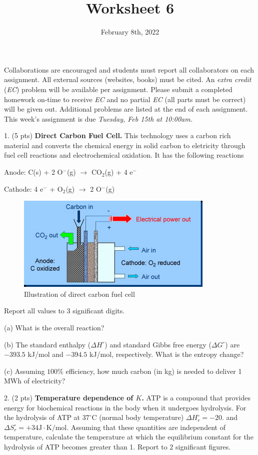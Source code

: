 \documentclass[11pt]{article}
\title{\textbf{Worksheet 6}}
\date{\vspace{-2em}February 8th, 2022}
\begin{document}
\maketitle

Collaborations are encouraged and students must report all collaborators
on each assignment. All external sources (websites, books) must be
cited. An \textit{extra credit} (\textit{EC}) problem will be available per
assignment. Please submit a completed homework on-time to receive \textit{EC}
and no partial \textit{EC} (all parts must be correct) will be given out.
Additional problems are listed at the end of each assignment. This week's
assignment is due \textit{Tuesday, Feb 15th at 10:00am.}

1. (5 pts) \textbf{Direct Carbon Fuel Cell.} This technology uses a carbon rich
material and converts the chemical energy in solid carbon to eletricity through
fuel cell reactions and electrochemical oxidation. It has the following reactions

  Anode: C(s) + 2 O$^-$(g) $\rightarrow$ CO$_2$(g) + 4 e$^-$

  Cathode: 4 e$^-$ + O$_2$(g) $\rightarrow$ 2 O$^-$(g)

\begin{figure}[hbpt]
  \centering
  \includegraphics[scale=1]{direct_carbon.jpg}
  \caption{Illustration of direct carbon fuel cell}
\end{figure}
Report all values to 3 significant digits.

(a) What is the overall reaction?

(b) The standard enthalpy ($\Delta H^\circ$) and standard Gibbs
free energy ($\Delta G^\circ$) are $-393.5$ kJ/mol and $-394.5$ kJ/mol,
respectively. What is the entropy change?

(c) Assuming $100\%$ efficiency, how much carbon (in kg) is needed to deliver
1 MWh of electricity?

\pagebreak

2. (2 pts) \textbf{Temperature dependence of $K$.} ATP is a compound that provides energy
for biochemical reactions in the body when it undergoes hydrolysis. For the hydrolysis
of ATP at $37^\circ\text{C}$ (normal body temperature) $\Delta H^\circ_r = -20.$ and
$\Delta S_r^\circ = +34 \text{J}\cdot\text{K/mol}$. Assuming that these quantities are independent
of temperature, calculate the temperature at which the equilibrium constant for the
hydrolysis of ATP becomes greater than 1. Report to 2 significant figures.
\end{document}
